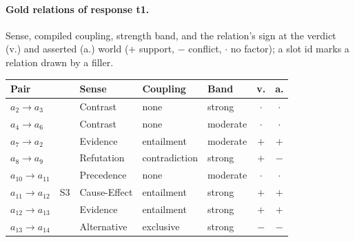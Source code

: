 \paragraph{Gold relations of response t1.} Sense, compiled coupling, strength band, and the relation's sign at the verdict (v.) and asserted (a.) world ($+$ support, $-$ conflict, $\cdot$ no factor); a slot id marks a relation drawn by a filler.

\begin{center}\scriptsize
\setlength{\tabcolsep}{2.2pt}
\begin{tabular}{@{}lllllcc@{}}
\toprule
Pair & & Sense & Coupling & Band & v. & a. \\
\midrule
$a_{2}\to a_{3}$ &  & Contrast & none & strong & $\cdot$ & $\cdot$ \\
$a_{4}\to a_{6}$ &  & Contrast & none & moderate & $\cdot$ & $\cdot$ \\
$a_{7}\to a_{2}$ &  & Evidence & entailment & moderate & $+$ & $+$ \\
$a_{8}\to a_{9}$ &  & Refutation & contradiction & strong & $+$ & $-$ \\
$a_{10}\to a_{11}$ &  & Precedence & none & moderate & $\cdot$ & $\cdot$ \\
$a_{11}\to a_{12}$ & S3 & Cause-Effect & entailment & strong & $+$ & $+$ \\
$a_{12}\to a_{13}$ &  & Evidence & entailment & strong & $+$ & $+$ \\
$a_{13}\to a_{14}$ &  & Alternative & exclusive & strong & $-$ & $-$ \\
\bottomrule
\end{tabular}
\end{center}
